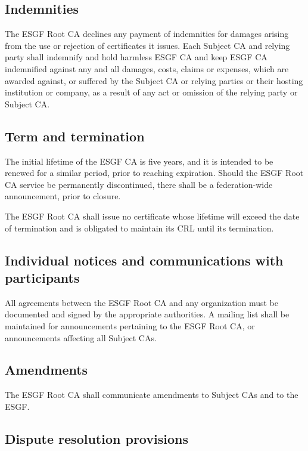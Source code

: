 \subsection{Indemnities}\label{indemnities}

The ESGF Root CA declines any payment of indemnities for damages
arising from the use or rejection of certificates it issues. Each
Subject CA and relying party shall indemnify and hold harmless ESGF CA
and keep ESGF CA indemnified against any and all damages, costs, claims
or expenses, which are awarded against, or suffered by the Subject CA or
relying parties or their hosting institution or company, as a result of
any act or omission of the relying party or Subject CA.

\subsection{Term and termination}\label{term-and-termination}

The initial lifetime of the ESGF CA is five years, and it is intended to be renewed for a similar period, prior to reaching expiration. Should the ESGF Root CA service be permanently discontinued, there shall be a federation-wide announcement, prior to closure.

The ESGF Root CA shall issue no certificate whose lifetime will exceed the date of termination and is obligated to maintain its CRL until its termination.

\subsection{Individual notices and communications with participants}\label{individual-notices-and-communications-with-participants}

All agreements between the ESGF Root CA and any organization must be
documented and signed by the appropriate authorities. A mailing list
shall be maintained for announcements pertaining to the ESGF Root CA, or announcements affecting all Subject CAs.

\subsection{Amendments}\label{amendments}

The ESGF Root CA shall communicate amendments to Subject CAs and to
the ESGF.

\subsection{Dispute resolution provisions}\label{dispute-resolution-provisions}

